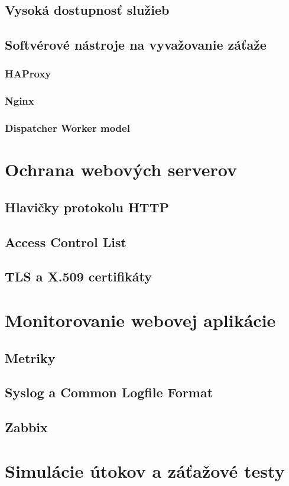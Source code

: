 \documentclass[11pt, a4paper]{article}
\begin{document}
\subsection{Vysoká dostupnosť služieb}

\subsection{Softvérové nástroje na vyvažovanie záťaže}

\subsubsection{HAProxy}

\subsubsection{Nginx}

\subsubsection{Dispatcher Worker model}


\section{Ochrana webových serverov}

\subsection{Hlavičky protokolu HTTP}

\subsection{Access Control List}

\subsection{TLS a X.509 certifikáty}



\section{Monitorovanie webovej aplikácie}

\subsection{Metriky}

\subsection{Syslog a Common Logfile Format}

\subsection{Zabbix}

\section{Simulácie útokov a záťažové testy}


\printbibliography[title={Literatúra}]
\end{document}
